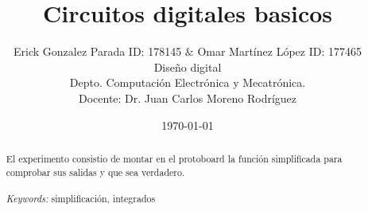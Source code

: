 \documentclass{article}
\begin{document}

\renewcommand{\footrulewidth}{1pt}
\renewcommand{\tablename}{Tabla}
\renewcommand{\figurename}{Figura}


\title{Circuitos digitales basicos}
\author{\small{Erick Gonzalez Parada ID: 178145 $\&$ Omar Martínez López ID: 177465} 
\\ \small{Diseño digital}
\\ \small{Depto. Computación Electrónica y Mecatrónica.}
\\ \small{Docente: Dr. Juan Carlos Moreno Rodríguez}}
\date{\small{\today}}

\maketitle


\begin{abstract}
El experimento consistio de montar en el protoboard la función simplificada para comprobar sus salidas y que sea verdadero.
\\
\\
{\it Keywords:}  simplificación, integrados  
\\
\\
\end{abstract}
\end{document}
